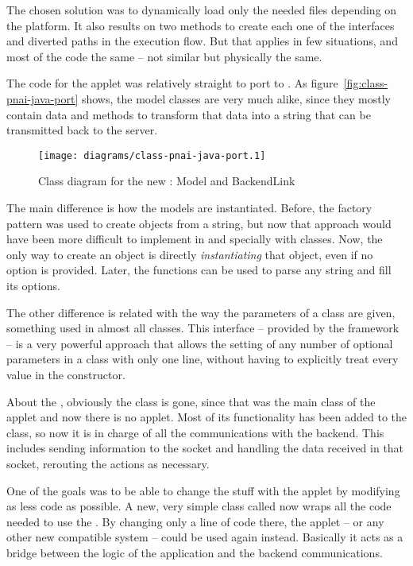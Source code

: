 The chosen solution was to dynamically load only the needed  files depending on the platform.
It also results on two methods to create each one of the interfaces and diverted paths in the execution flow.
But that applies in few situations, and most of the code the same -- not similar but physically the same.

The  code for the applet was relatively straight to port to .
As figure~\vref{fig:class-pnai-java-port} shows, the model classes are very much alike, since they mostly contain data and methods to transform that data into a string that can be transmitted back to the server.

\begin{figure}[htbp]
  \centering
    \texttt{[image: diagrams/class-pnai-java-port.1]}
  \caption{Class diagram for the new : Model and BackendLink}
  \label{fig:class-pnai-java-port}
\end{figure}

The main difference is how the models are instantiated.
Before, the factory pattern was used to create objects from a string, but now that approach would have been more difficult to implement in  and specially with  classes.
Now, the only way to create an object is directly \emph{instantiating} that object, even if no option is provided.
Later, the  functions can be used to parse any string and fill its options.

The other difference is related with the way the parameters of a class are given, something used in almost all classes.
This  interface -- provided by the  framework -- is a very powerful approach that allows the setting of any number of optional parameters in a class with only one line, without having to explicitly treat every value in the constructor.

About the , obviously the  class is gone, since that was the main class of the applet and now there is no applet.
Most of its functionality has been added to the  class, so now it is in charge of all the communications with the backend.
This includes sending information to the  socket and handling the data received in that socket, rerouting the actions as necessary.

One of the goals was to be able to change the  stuff with the applet by modifying as less code as possible.
A new, very simple class called  now wraps all the code needed to use the .
By changing only a line of code there, the applet -- or any other new compatible system -- could be used again instead.
Basically it acts as a bridge between the logic of the application and the backend communications.

